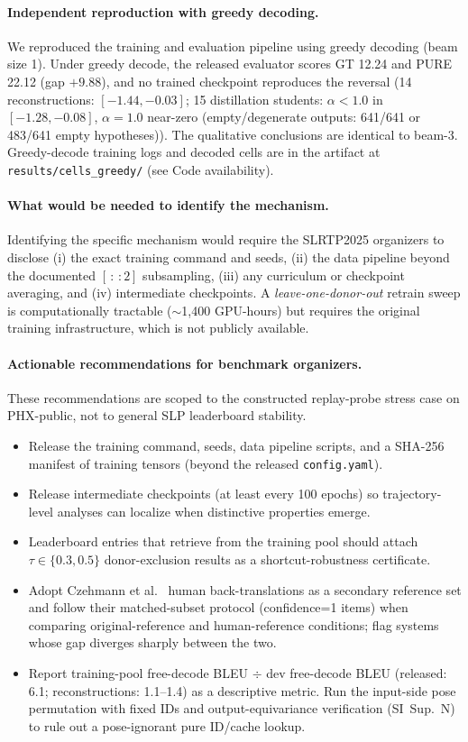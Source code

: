\documentclass[pdflatex,sn-chicago]{sn-jnl}
\begin{document}
\paragraph{Independent reproduction with greedy decoding.}
We reproduced the training and evaluation pipeline using greedy decoding (beam size 1). Under greedy decode, the released evaluator scores GT 12.24 and PURE 22.12 (gap $+9.88$), and no trained checkpoint reproduces the reversal (14 reconstructions: $[-1.44, -0.03]$; 15 distillation students: $\alpha{<}1.0$ in $[-1.28, -0.08]$, $\alpha{=}1.0$ near-zero (empty/degenerate outputs: 641/641 or 483/641 empty hypotheses)). The qualitative conclusions are identical to beam-3. Greedy-decode training logs and decoded cells are in the artifact at \texttt{results/cells\_greedy/} (see Code availability).

\paragraph{What would be needed to identify the mechanism.}
Identifying the specific mechanism would require the SLRTP2025 organizers to disclose (i) the exact training command and seeds, (ii) the data pipeline beyond the documented $[\,{:}\,{:}2]$ subsampling, (iii) any curriculum or checkpoint averaging, and (iv) intermediate checkpoints. A \emph{leave-one-donor-out} retrain sweep is computationally tractable ($\sim$1{,}400 GPU-hours) but requires the original training infrastructure, which is not publicly available.

\paragraph{Actionable recommendations for benchmark organizers.}
These recommendations are scoped to the constructed replay-probe stress case on PHX-public, not to general SLP leaderboard stability.
\begin{itemize}
\item Release the training command, seeds, data pipeline scripts, and a SHA-256 manifest of training tensors (beyond the released \texttt{config.yaml}).
\item Release intermediate checkpoints (at least every 100 epochs) so trajectory-level analyses can localize when distinctive properties emerge.
\item Leaderboard entries that retrieve from the training pool should attach $\tau \in \{0.3, 0.5\}$ donor-exclusion results as a shortcut-robustness certificate.
\item Adopt Czehmann et al.~\cite{czehmann2026sacred} human back-translations as a secondary reference set and follow their matched-subset protocol (confidence=1 items) when comparing original-reference and human-reference conditions; flag systems whose gap diverges sharply between the two.
\item Report training-pool free-decode BLEU $\div$ dev free-decode BLEU (released: 6.1; reconstructions: 1.1--1.4) as a descriptive metric. Run the input-side pose permutation with fixed IDs and output-equivariance verification (SI~Sup.~N) to rule out a pose-ignorant pure ID/cache lookup.
\end{itemize}
\end{document}
